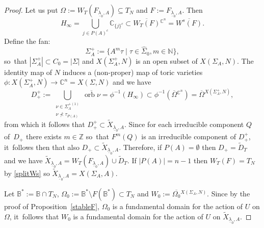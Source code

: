 \documentclass[JEP,XML,SOM,Unicode,NoFloatCountersInSection]{cedram}
\theoremstyle{definition}
\let\wt\widetilde
\let\la\lambda
\let\ov\overline
\let\sminus\setminus
\let\un\underline
\newcommand{\BB}{\mathbb{B}}
\newcommand{\CC}{\mathbb{C}}
\newcommand{\NN}{\mathbb{N}}
\newcommand{\ZZ}{\mathbb{Z}}
\DeclareMathOperator{\orb}{orb}
\begin{document}
\begin{proof}
Let us put $\Omega:=W_T(F_{\un\la_0,A})\subseteq T_N$ and $F:=F_{\un\la_0,A}$. Then
\[
H_\infty=\bigcup_{j\in P(A)^c}\CC_{\{j\}^c}\subset\ov{W_T(F)}{}^{\CC^n}=\ov{W^s(F)}.
\]
Define the fan:
\begin{equation*}
\Sigma_{A}^+:=\{A^m\tau\mid\tau\in\hat{\Sigma}_0, m\in\NN\},
\end{equation*}
so~that $|\Sigma_A^+|\subset C_0=|\Sigma|$ and $X(\Sigma_A^+,N)$ is an open subset of $X(\Sigma_A,N)$. The identity map of $N$ induces a (non-proper) map of toric varieties \hbox{$\phi:X(\Sigma^+_A, N)\to \CC^n\!=\!X(\Sigma,N)$} and we have
\begin{equation*}
D_+^+:=\bigcup_{\substack{\nu\in\Sigma_A^{+(1)}\\ \nu\not\prec \tau_{P(A)}}}\ov{\orb\nu}=\phi^{-1}(H_\infty)\subset
\phi^{-1}(\ov{\Omega}{}^{\CC^n})=\ov{\Omega}{}^{X(\Sigma^+_A,N)},
\end{equation*}
from which it follows that $D^+_+\subset\wt{X}_{\un\la_0,A}$. Since for each irreducible component $Q$ of~$D_+$ there exists $m\in\ZZ$ so~that $F^m(Q)$ is an irreducible component of $D_+^+$, it~follows then that also $D_+\subset\wt{X}_{\un\la_0,A}$. Therefore, if $P(A)=\emptyset$ then $D_+=\wt{D}_T$ and we have $\wt{X}_{\un\la_0,A}=W_T(F_{\un\la_0,A})\cup \wt{D}_T$. If $|P(A)|= n-1$ then $W_T(F)=T_N$ by \ref{splitWs} so $\wt{X}_{\un\la_0,A}=X(\Sigma_A,A)$.

Let $\BB^*:=\BB\cap T_N$, $\Omega_0:=\BB^*\sminus F(\BB^*)\subset T_N$ and $W_0:=\ov{\Omega_0}{}{}^{X(\Sigma_A,N)}$. Since by the proof of Proposition~\ref{stableF}, $\Omega_0$ is a fundamental domain for the action of $U$ on $\Omega$, it~follows that $W_0$ is a fundamental domain for the action of $U$ on $\wt{X}_{\un\la_0,A}$.


\end{proof}
\end{document}
